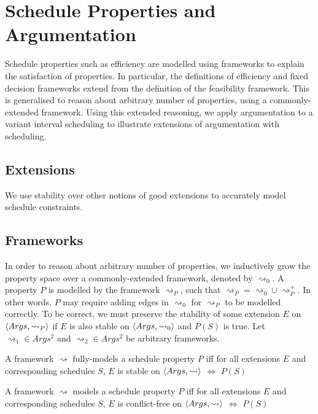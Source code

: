 \chapter{Schedule Properties and Argumentation}

Schedule properties such as efficiency are modelled using frameworks to explain the satisfaction of properties. In particular, the definitions of efficiency and fixed decision frameworks extend from the definition of the feasibility framework. This is generalised to reason about arbitrary number of properties, using a commonly-extended framework. Using this extended reasoning, we apply argumentation to a variant interval scheduling to illustrate extensions of argumentation with scheduling.
 
\section{Extensions}

We use stability over other notions of good extensions to accurately model schedule constraints.

\section{Frameworks}

In order to reason about arbitrary number of properties, we inductively grow the property space over a commonly-extended framework, denoted by $\rightsquigarrow_0$. A property $P$ is modelled by the framework $\rightsquigarrow_P$, such that $\rightsquigarrow_P=\rightsquigarrow_0\cup\rightsquigarrow_P^+$. In other words, $P$ may require adding edges in $\rightsquigarrow_0$ for $\rightsquigarrow_P$ to be modelled correctly. To be correct, we must preserve the stability of some extension $E$ on $\langle{Args},{\rightsquigarrow_P}\rangle$ if $E$ is also stable on $\langle{Args},{\rightsquigarrow_0}\rangle$ and $P(S)$ is true. Let $\rightsquigarrow_1\in Args^2$ and $\rightsquigarrow_2\in Args^2$ be arbitrary frameworks.

\begin{definition}
	A framework $\rightsquigarrow$ fully-models a schedule property $P$ iff for all extensions $E$ and corresponding schedules $S$, $E$ is stable on $\langle{Args},{\rightsquigarrow}\rangle$ $\Leftrightarrow$ $P(S)$
\end{definition}

\begin{definition}
	A framework $\rightsquigarrow$ models a schedule property $P$ iff for all extensions $E$ and corresponding schedules $S$, $E$ is conflict-free on $\langle{Args},{\rightsquigarrow}\rangle$ $\Leftrightarrow$ $P(S)$
\end{definition}

